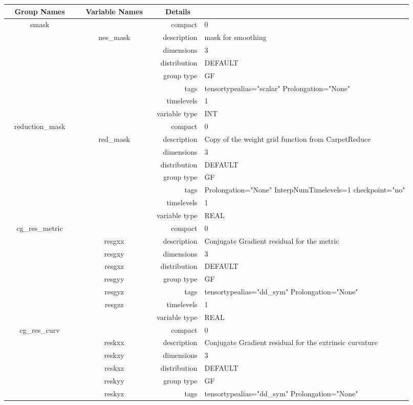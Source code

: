 \begin{tabular*}{150mm}{|c|c@{\extracolsep{\fill}}|rl|} \hline 
~ {\bf Group Names} ~ & ~ {\bf Variable Names} ~  &{\bf Details} ~ & ~\\ 
\hline 
smask &  & compact & 0 \\ 
 & nes\_mask & description & mask for smoothing \\ 
 &  & dimensions & 3 \\ 
 &  & distribution & DEFAULT \\ 
 &  & group type & GF \\ 
 &  & tags & tensortypealias="scalar" Prolongation="None" \\ 
 &  & timelevels & 1 \\ 
 &  & variable type & INT \\ 
\hline 
reduction\_mask &  & compact & 0 \\ 
 & red\_mask & description & Copy of the weight grid function from CarpetReduce \\ 
 &  & dimensions & 3 \\ 
 &  & distribution & DEFAULT \\ 
 &  & group type & GF \\ 
 &  & tags & Prolongation="None" InterpNumTimelevels=1 checkpoint="no" \\ 
 &  & timelevels & 1 \\ 
 &  & variable type & REAL \\ 
\hline 
cg\_res\_metric &  & compact & 0 \\ 
 & resgxx & description & Conjugate Gradient residual for the metric \\ 
 & resgxy & dimensions & 3 \\ 
 & resgxz & distribution & DEFAULT \\ 
 & resgyy & group type & GF \\ 
 & resgyz & tags & tensortypealias="dd\_sym" Prolongation="None" \\ 
 & resgzz & timelevels & 1 \\ 
 &  & variable type & REAL \\ 
\hline 
cg\_res\_curv &  & compact & 0 \\ 
 & reskxx & description & Conjugate Gradient residual for the extrinsic curvature \\ 
 & reskxy & dimensions & 3 \\ 
 & reskxz & distribution & DEFAULT \\ 
 & reskyy & group type & GF \\ 
 & reskyz & tags & tensortypealias="dd\_sym" Prolongation="None" \\ 

\end{tabular*}
